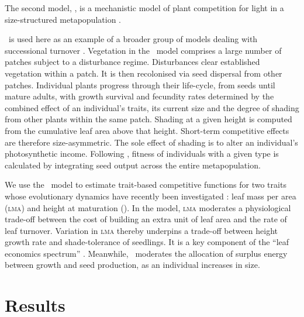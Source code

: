 \documentclass[a4paper,11pt]{article}
\begin{document}
The second model, \plant, is a mechanistic model of plant competition
for light in a size-structured metapopulation
\citep{Falster-2011, Falster-2015, Falster-2016}.

\plant\ is used here as an example of a broader group
of models dealing with successional turnover
\citep{Huston-1987,Kohyama-1993,Moorcroft-2001,Falster-2011}.
%
Vegetation in the \plant\ model comprises a large number of patches subject
to a disturbance regime.  Disturbances clear established
vegetation within a patch. It is then recolonised via seed
dispersal from other patches.  Individual plants progress through
their life-cycle, from seeds until mature adults, with growth survival
and fecundity rates determined by the combined effect of an
individual's traits, its current size and the degree of shading from
other plants within the same patch. Shading at a given
height is computed from the cumulative leaf area above that height.
Short-term competitive effects are therefore size-asymmetric. The sole
effect of shading is to alter an individual's photosynthetic
income. Following \citep{Falster-2015}, fitness of individuals
with a given type is calculated by integrating seed output across the
entire metapopulation.

We use the \plant\ model to estimate trait-based competitive functions
for two traits whose evolutionary dynamics have recently been
investigated \citep{Falster-2015}: leaf mass per area (\textsc{lma})
and height at maturation (\hmat). In the model, \textsc{lma} moderates
a physiological trade-off between the cost of building an extra unit
of leaf area and the rate of leaf turnover.  Variation in \textsc{lma}
thereby underpins a trade-off between height growth rate and
shade-tolerance of seedlings. It is a key component of the
``leaf economics spectrum'' \citep{Wright-2004}. Meanwhile, \hmat\
moderates the allocation of surplus energy between growth and seed
production, as an individual increases in size.

\section{Results}

%

\subsection{\Rstar}
\end{document}
